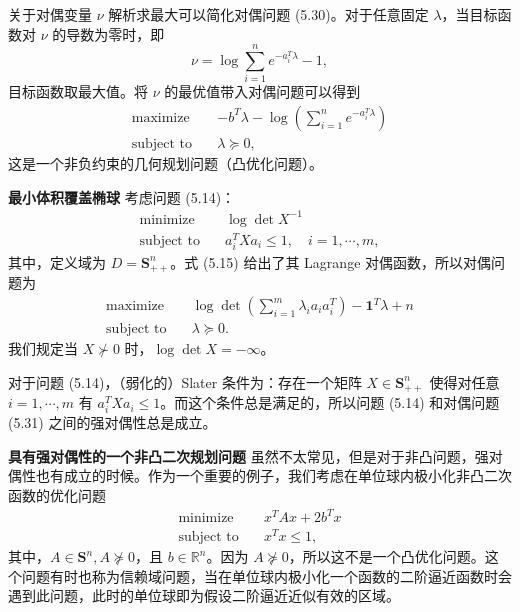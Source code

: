 \documentclass[UTF8,12pt,a4paper,fontset=fandol]{ctexart}
\begin{document}
关于对偶变量 $\nu$ 解析求最大可以简化对偶问题 (5.30)。对于任意固定 $\lambda$，当目标函数对 $\nu$ 的导数为零时，即
\[
\nu=\log\sum_{i=1}^n e^{-a_i^T\lambda}-1,
\]
目标函数取最大值。将 $\nu$ 的最优值带入对偶问题可以得到
\[
\begin{aligned}
\text{maximize}\quad & -b^T\lambda-\log\left(\sum_{i=1}^n e^{-a_i^T\lambda}\right)\\
\text{subject to}\quad & \lambda\succeq 0,
\end{aligned}
\]
这是一个非负约束的几何规划问题（凸优化问题）。

\noindent\textbf{最小体积覆盖椭球}\quad
考虑问题 (5.14)：
\[
\begin{aligned}
\text{minimize}\quad & \log\det X^{-1}\\
\text{subject to}\quad & a_i^T X a_i\leq 1,\quad i=1,\cdots,m,
\end{aligned}
\]
其中，定义域为 $D=\mathbf{S}_{++}^n$。式 (5.15) 给出了其 Lagrange 对偶函数，所以对偶问题为
\begin{equation}
\begin{aligned}
\text{maximize}\quad & \log\det\left(\sum_{i=1}^m\lambda_i a_i a_i^T\right)-\mathbf{1}^T\lambda+n\\
\text{subject to}\quad & \lambda\succeq 0.
\end{aligned}
\tag{5.31}
\end{equation}
我们规定当 $X\not\succ 0$ 时，$\log\det X=-\infty$。

对于问题 (5.14)，（弱化的）Slater 条件为：存在一个矩阵 $X\in\mathbf{S}_{++}^n$ 使得对任意 $i=1,\cdots,m$ 有 $a_i^TXa_i\leq 1$。而这个条件总是满足的，所以问题 (5.14) 和对偶问题 (5.31) 之间的强对偶性总是成立。

\noindent\textbf{具有强对偶性的一个非凸二次规划问题}\quad
虽然不太常见，但是对于非凸问题，强对偶性也有成立的时候。作为一个重要的例子，我们考虑在单位球内极小化非凸二次函数的优化问题
\begin{equation}
\begin{aligned}
\text{minimize}\quad & x^TAx+2b^Tx\\
\text{subject to}\quad & x^Tx\leq 1,
\end{aligned}
\tag{5.32}
\end{equation}
其中，$A\in\mathbf{S}^n,A\not\succeq 0$，且 $b\in\mathbb{R}^n$。因为 $A\not\succeq 0$，所以这不是一个凸优化问题。这个问题有时也称为信赖域问题，当在单位球内极小化一个函数的二阶逼近函数时会遇到此问题，此时的单位球即为假设二阶逼近近似有效的区域。
\end{document}
